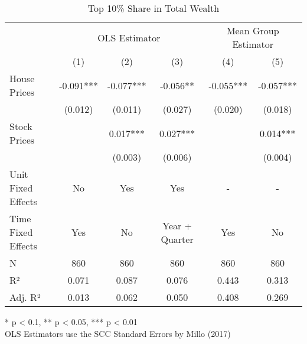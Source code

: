 \begin{table}[t]
\caption{Top 10\% Share in Total Wealth} 
\fontsize{12.0pt}{14.4pt}\selectfont
\begin{tabular*}{\linewidth}{@{\extracolsep{\fill}}lccccc}
\toprule
 & \multicolumn{3}{c}{OLS Estimator} & \multicolumn{2}{c}{Mean Group Estimator} \\ 
\cmidrule(lr){2-4} \cmidrule(lr){5-6}
  & (1) & (2) & (3) & (4) & (5) \\ 
\midrule\addlinespace[2.5pt]
House Prices & -0.091*** & -0.077*** & -0.056** & -0.055*** & -0.057*** \\ 
 & (0.012) & (0.011) & (0.027) & (0.020) & (0.018) \\ 
Stock Prices &  & 0.017*** & 0.027*** &  & 0.014*** \\ 
{} & {} & {(0.003)} & {(0.006)} & {} & {(0.004)} \\ 
Unit Fixed Effects & No & Yes & Yes & - & - \\ 
{Time Fixed Effects} & {Yes} & {No} & {Year + Quarter} & {Yes} & {No} \\ 
N & 860 & 860 & 860 & 860 & 860 \\ 
R² & 0.071 & 0.087 & 0.076 & 0.443 & 0.313 \\ 
Adj. R² & 0.013 & 0.062 & 0.050 & 0.408 & 0.269 \\ 
\bottomrule
\end{tabular*}
\begin{minipage}{\linewidth}
* p < 0.1, ** p < 0.05, *** p < 0.01\\
OLS Estimators use the SCC Standard Errors by Millo (2017)\\
\end{minipage}
\end{table}

